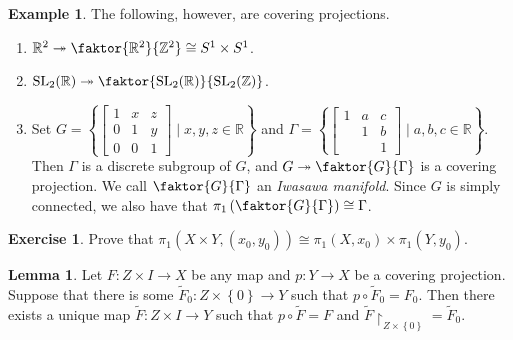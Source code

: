 \documentclass[10pt,letterpaper,cm]{nupset}
\theoremstyle{definition}
\newtheorem{exmp}[definition]{Example}
\theoremstyle{theorem}
\newtheorem{lemma}[definition]{Lemma}
\newtheorem{exercise}[definition]{Exercise}
\theoremstyle{remark}
\newcommand{\R}{\mathbb{R}}
\newcommand{\Z}{\mathbb Z}
\newcommand{\1}{\mathbb{1}}
\newcommand{\0}{\vec 0}
\DeclareMathOperator{\SL}{SL}
\begin{document}
\begin{exmp} The following, however, are covering projections.
\begin{enumerate}
\item $\R^2 \twoheadrightarrow \faktor{\R^2}{\Z^2} \cong S^1 \times S^1$.
\item $\SL_2(\R) \twoheadrightarrow \faktor{\SL_2(\R)}{\SL_2(\Z)}$.
\item Set $G = \left \{ \begin{bmatrix} 1 & x & z \\ 0 & 1 & y \\ 0 & 0 & 1 \end{bmatrix}  \mid x,y,z \in \R \right \}$ and $\Gamma = \left \{ \begin{bmatrix} 1 & a & c \\  & 1 & b \\  &  & 1 \end{bmatrix} \mid a,b,c \in \R \right \}$. Then $\Gamma$ is a discrete subgroup of $G$, and $G \twoheadrightarrow \faktor{G}{\Gamma}$ is a covering projection. We call $\faktor{G}{\Gamma}$ an \textit{Iwasawa manifold}.
Since $G$ is simply connected, we also have that $\pi_1 \left(\faktor{G}{\Gamma} \right) \cong \Gamma$.
\end{enumerate}
\end{exmp}

\begin{exercise}
Prove that $\pi_1(X \times Y, (x_0, y_0)) \cong \pi_1\left(X, x_0\right) \times \pi_1\left(Y, y_0\right)$.
\end{exercise}

\begin{lemma}
Let $F : Z \times I \to X$ be any map and $p: Y \to X$ be a covering projection. Suppose that there is some $\widetilde{F}_0 : Z \times \left\{0\right\} \to Y$ such that $p \circ \widetilde{F}_0 = F_0$. Then there exists a unique map $\widetilde{F} : Z \times I \to Y$ such that $p \circ \widetilde{F} = F$ and $\widetilde{F} \restriction_{Z\times \left\{0\right\}} = \widetilde{F}_0$.
\end{lemma}
\end{document}
